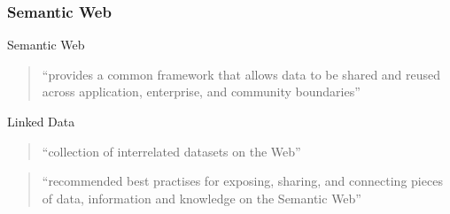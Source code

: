 \documentclass{beamer}
\begin{document}
\begin{frame}
\frametitle{Semantic Web}

\begin{block}{Semantic Web}
  \begin{quote}
    ``provides a common framework that allows data to be shared and reused across application, enterprise, and community
    boundaries''
  \end{quote}
\end{block}
\pause
\begin{block}{Linked Data}
  \begin{quote}
  ``collection of interrelated datasets on the Web''
  \end{quote}
  \begin{quote}
  ``recommended best practises for exposing, sharing, and connecting pieces of data, information and knowledge on the
Semantic Web''
  \end{quote}
\end{block}
\end{frame}
\end{document}
